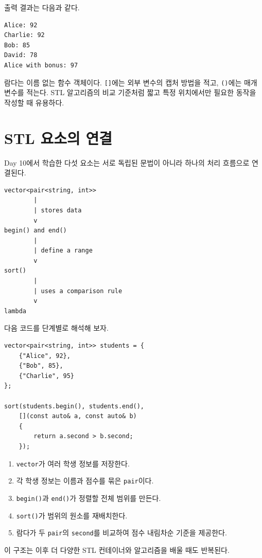 \documentclass[11pt,a4paper]{article}
\begin{document}
출력 결과는 다음과 같다.

\begin{verbatim}
Alice: 92
Charlie: 92
Bob: 85
David: 78
Alice with bonus: 97
\end{verbatim}

\begin{importantbox}
람다는 이름 없는 함수 객체이다. \texttt{[]}에는 외부 변수의 캡처 방법을 적고, \texttt{()}에는 매개변수를 적는다. STL 알고리즘의 비교 기준처럼 짧고 특정 위치에서만 필요한 동작을 작성할 때 유용하다.
\end{importantbox}

\section{STL 요소의 연결}
Day 10에서 학습한 다섯 요소는 서로 독립된 문법이 아니라 하나의 처리 흐름으로 연결된다.

\begin{verbatim}
vector<pair<string, int>>
        |
        | stores data
        v
begin() and end()
        |
        | define a range
        v
sort()
        |
        | uses a comparison rule
        v
lambda
\end{verbatim}

다음 코드를 단계별로 해석해 보자.

\begin{lstlisting}
vector<pair<string, int>> students = {
    {"Alice", 92},
    {"Bob", 85},
    {"Charlie", 95}
};

sort(students.begin(), students.end(),
    [](const auto& a, const auto& b)
    {
        return a.second > b.second;
    });
\end{lstlisting}

\begin{enumerate}[leftmargin=2em]
    \item \texttt{vector}가 여러 학생 정보를 저장한다.
    \item 각 학생 정보는 이름과 점수를 묶은 \texttt{pair}이다.
    \item \texttt{begin()}과 \texttt{end()}가 정렬할 전체 범위를 만든다.
    \item \texttt{sort()}가 범위의 원소를 재배치한다.
    \item 람다가 두 \texttt{pair}의 \texttt{second}를 비교하여 점수 내림차순 기준을 제공한다.
\end{enumerate}

이 구조는 이후 더 다양한 STL 컨테이너와 알고리즘을 배울 때도 반복된다.
\end{document}
